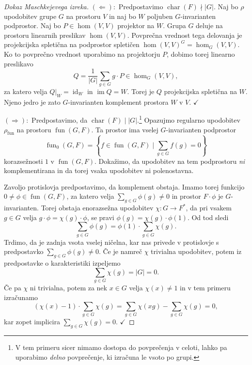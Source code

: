 \documentclass[11pt]{book}
\DeclareMathOperator\image{im}
\DeclareMathOperator\characteristic{char}
\DeclareMathOperator\fun{fun}
\DeclareMathOperator\id{id}
\def\kljuka{$\checkmark$}
\theoremstyle{definition}
\theoremstyle{zgled}
\theoremstyle{odprtproblem}
\theoremstyle{domacanaloga}
\newenvironment{dokaz}
    {\color{siva}\begin{proof}}
    {\end{proof}}
\theoremstyle{izrek}
\begin{document}
\begin{dokaz}[Dokaz Maschkejevega izreka]
$(\Leftarrow):$ Predpostavimo $\characteristic(F) \nmid |G|$. Naj bo $\rho$ upodobitev grupe $G$ na prostoru $V$ in naj bo $W$ poljuben $G$-invarianten podprostor. Naj bo $P \in \hom(V,V)$ projektor na $W$. Grupa $G$ deluje na prostoru linearnih preslikav $\hom(V,V)$. Povprečna vrednost tega delovanja je projekcijska spletična na podprostor spletičen $\hom(V,V)^G = \hom_G(V,V)$. Ko to povprečno vrednost uporabimo na projektorju $P$, dobimo torej linearno preslikavo
\[
    Q = \frac{1}{|G|} \sum_{g \in G} g \cdot P \in \hom_G(V,V),
\]
za katero velja $Q|_W = \id_W$ in $\image Q = W$. Torej je $Q$ projekcijska spletična na $W$. Njeno jedro je zato $G$-invarianten komplement prostora $W$ v $V$. \kljuka

$(\Rightarrow):$ Predpostavimo, da $\characteristic(F) \mid |G|$.\footnote{V tem primeru sicer nimamo dostopa do povprečenja v celoti, lahko pa uporabimo \emph{delno} povprečenje, ki izračuna le vsoto po grupi.} Opazujmo regularno upodobitev $\rho_{\fun}$ na prostoru $\fun(G,F)$. Ta prostor ima vselej $G$-invarianten podprostor
\[
    \textstyle \fun_0(G,F) = \left\{ f \in \fun(G,F) \mid \sum_{g \in G} f(g) = 0 \right\}
\]
korazsežnosti $1$ v $\fun(G,F)$. Dokažimo, da upodobitev na tem podprostoru \emph{ni} komplementirana in da torej vsaka upodobitev ni polenostavna. 

Zavoljo protislovja predpostavimo, da komplement obstaja. Imamo torej funkcijo $0 \neq \phi \in \fun(G,F)$, za katero velja $\sum_{g \in G} \phi(g) \neq 0$ in prostor $F \cdot \phi$ je $G$-invarianten. Torej obstaja enorazsežna upodobitev $\chi \colon G \to F^*$, da pri vsakem $g \in G$ velja $g \cdot \phi = \chi(g) \cdot \phi$, se pravi $\phi(g) = \chi(g) \cdot \phi(1)$. Od tod sledi 
\[
    \sum_{g \in G} \phi(g) = \phi(1) \cdot \sum_{g \in G} \chi(g).
\]
Trdimo, da je zadnja vsota vselej ničelna, kar nas privede v protislovje s predpostavko $\sum_{g \in G} \phi(g) \neq 0$. Če je namreč $\chi$ trivialna upodobitev, potem iz predpostavke o karakteristiki izpeljemo
\[
    \sum_{g \in G} \chi(g) = |G| = 0.
\]
Če pa $\chi$ ni trivialna, potem za nek $x \in G$ velja $\chi(x) \neq 1$ in v tem primeru izračunamo
\[
    (\chi(x) - 1) \cdot \sum_{g \in G} \chi(g) = \sum_{g \in G} \chi(xg) - \sum_{g \in G} \chi(g) = 0,
\]
kar zopet implicira $\sum_{g \in G} \chi(g) = 0$. \kljuka
\end{dokaz}
\end{document}
